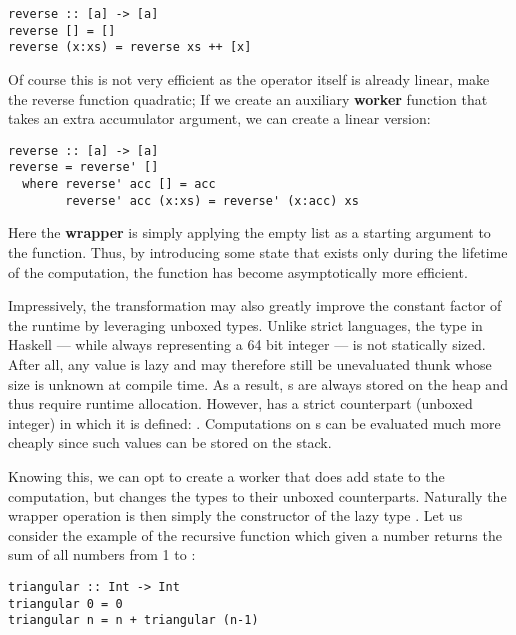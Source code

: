 \begin{listing}[H]
\begin{verbatim}
reverse :: [a] -> [a]
reverse [] = []
reverse (x:xs) = reverse xs ++ [x]
\end{verbatim}
\end{listing}

Of course this is not very efficient as the \mono{++} operator itself is already linear, make the reverse function quadratic; If we
create an auxiliary \textbf{worker} function  that takes an extra accumulator argument, we can create a linear version:

\begin{listing}[H]
\begin{verbatim}
reverse :: [a] -> [a]
reverse = reverse' []
  where reverse' acc [] = acc
        reverse' acc (x:xs) = reverse' (x:acc) xs
\end{verbatim}
\end{listing}

Here the \textbf{wrapper} is simply applying the empty list as a starting argument to the function. Thus, by introducing some state
that exists only during the lifetime of the computation, the function has become asymptotically more efficient.

Impressively, the transformation may also greatly improve the constant factor of the runtime by leveraging unboxed types.
Unlike strict languages, the  type in Haskell --- while always representing a 64 bit integer --- is not statically sized.
After all, any value is lazy and may therefore still be unevaluated thunk whose size is unknown at compile time. As a result, s
are always stored on the heap and thus require runtime allocation. However,  has a strict counterpart  (unboxed integer)
in which it is defined: . Computations on s can be evaluated much more cheaply since such values can be
stored on the stack.

Knowing this, we can opt to create a worker that does add state to the computation, but changes the types to their unboxed counterparts.
Naturally the wrapper operation is then simply the constructor of the lazy type . Let us consider the example of the recursive  function which
given a number  returns the sum of all numbers from 1 to :

\begin{listing}[H]
\begin{verbatim}
triangular :: Int -> Int
triangular 0 = 0
triangular n = n + triangular (n-1)
\end{verbatim}
\end{listing}


